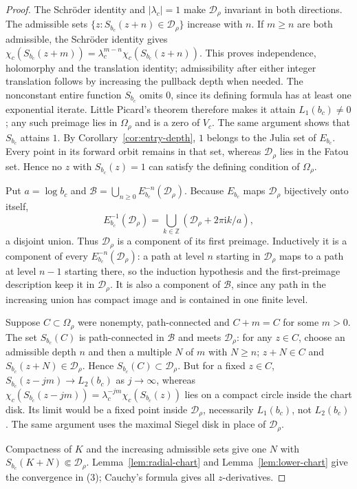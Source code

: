 \documentclass[11pt,a4paper]{article}
\theoremstyle{definition}
\newcommand{\ii}{\mathrm{i}}
\begin{document}
\begin{proof}
The Schr\"oder identity and $|\lambda_c|=1$ make
$\mathcal D_\rho$ invariant in both directions.  The admissible sets
$\{z:S_{b_c}(z+n)\in\mathcal D_\rho\}$ increase with $n$.
If $m\ge n$ are both admissible, the Schr\"oder identity gives
$\chi_c(S_{b_c}(z+m))=\lambda_c^{m-n}\chi_c(S_{b_c}(z+n))$.
This proves independence, holomorphy and the translation identity;
admissibility after either integer translation follows by increasing
the pullback depth when needed.  The nonconstant entire function $S_{b_c}$
omits $0$, since its defining formula has at least one exponential
iterate.  Little Picard's theorem therefore makes it attain
$L_1(b_c)\ne0$; any such preimage lies in $\Omega_\rho$ and is a zero
of $V_c$.  The same argument shows that $S_{b_c}$ attains $1$.
By Corollary~\ref{cor:entry-depth}, $1$ belongs to the Julia
set of $E_{b_c}$.  Every point in its forward orbit remains in that set,
whereas $\mathcal D_\rho$ lies in the Fatou set.  Hence no $z$ with
$S_{b_c}(z)=1$ can satisfy the defining condition of $\Omega_\rho$.

Put $a=\log b_c$ and
$\mathcal B=\bigcup_{n\ge0}E_{b_c}^{-n}(\mathcal D_\rho)$.
Because $E_{b_c}$ maps $\mathcal D_\rho$ bijectively onto itself,
\[
 E_{b_c}^{-1}(\mathcal D_\rho)
 =\bigcup_{k\in\mathbb Z}
    (\mathcal D_\rho+2\pi\ii k/a),
\]
a disjoint union.  Thus $\mathcal D_\rho$ is a component of its first
preimage.  Inductively it is a component of every
$E_{b_c}^{-n}(\mathcal D_\rho)$: a path at level $n$ starting in
$\mathcal D_\rho$ maps to a path at level $n-1$ starting there, so the
induction hypothesis and the first-preimage description keep it in
$\mathcal D_\rho$.  It is also a component of $\mathcal B$, since any
path in the increasing union has compact image and is contained in one
finite level.

Suppose $C\subset\Omega_\rho$ were nonempty, path-connected and
$C+m=C$ for some $m>0$.  The set $S_{b_c}(C)$ is path-connected in
$\mathcal B$ and meets $\mathcal D_\rho$: for any $z\in C$, choose an
admissible depth $n$ and then a multiple $N$ of $m$ with $N\ge n$;
$z+N\in C$ and $S_{b_c}(z+N)\in\mathcal D_\rho$.  Hence
$S_{b_c}(C)\subset\mathcal D_\rho$.  But for a fixed $z\in C$,
$S_{b_c}(z-jm)\to L_2(b_c)$ as $j\to\infty$, whereas
$\chi_c(S_{b_c}(z-jm))=\lambda_c^{-jm}\chi_c(S_{b_c}(z))$ lies on a
compact circle inside the chart disk.  Its limit would be a fixed
point inside $\mathcal D_\rho$, necessarily $L_1(b_c)$, not $L_2(b_c)$.
The same argument uses the maximal Siegel disk in place of
$\mathcal D_\rho$.

Compactness of $K$ and the increasing admissible sets give one $N$
with $S_{b_c}(K+N)\Subset\mathcal D_\rho$.  Lemma~\ref{lem:radial-chart} and
Lemma~\ref{lem:lower-chart} give the convergence in (3); Cauchy's
formula gives all $z$-derivatives.
\end{proof}
\end{document}
